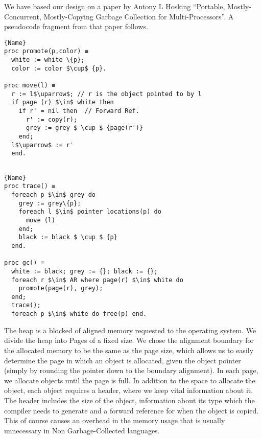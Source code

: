 \documentclass{article}
\begin{document}
We have based our design on a paper by Antony L Hosking ``Portable, Mostly-Concurrent, Mostly-Copying Garbage Collection for Multi-Processors''. A pseudocode fragment from that paper follows. 

\noindent\begin{minipage}{.46\textwidth}
\begin{lstlisting}[caption=code 1,frame=tlrb, mathescape]{Name}
proc promote(p,color) ≡ 
  white := white \{p}; 
  color := color $\cup$ {p}.

proc move(l) ≡ 
  r := l$\uparrow$; // r is the object pointed to by l
  if page (r) $\in$ white then 
    if r' = nil then  // Forward Ref. 
      r' := copy(r);
      grey := grey $ \cup $ {page(r′)}
    end;
  l$\uparrow$ := r′
  end.


\end{lstlisting}
\end{minipage}\hfill
\begin{minipage}{.45\textwidth}
\begin{lstlisting}[caption=code 2,frame=tlrb, mathescape]{Name}
proc trace() ≡ 
  foreach p $\in$ grey do
    grey := grey\{p};
    foreach l $\in$ pointer locations(p) do
      move (l)
    end;
    black := black $ \cup $ {p}
  end.

proc gc() ≡
  white := black; grey := {}; black := {}; 
  foreach r $\in$ AR where page(r) $\in$ white do
    promote(page(r), grey);
  end;
  trace();
  foreach p $\in$ white do free(p) end.
\end{lstlisting}
\end{minipage}

The heap is a blocked of aligned memory requested to the operating system. We divide the heap into Pages of a fixed
size. We chose the alignment boundary for the allocated memory to be the same as the page size, which allows us
to easily determine the page in which an object is allocated, given the object pointer (simply by rounding the pointer
down to the boundary alignment). In each page, we allocate objects until the page is full. In addition to the space 
to allocate the object, each object requires a header, where we keep vital information about it. The header includes the size of the object, information about its type which the compiler needs to generate and a forward reference for when the object is copied. This of course causes an overhead in the memory usage that is usually unnecessary in Non Garbage-Collected languages. 
\end{document}
